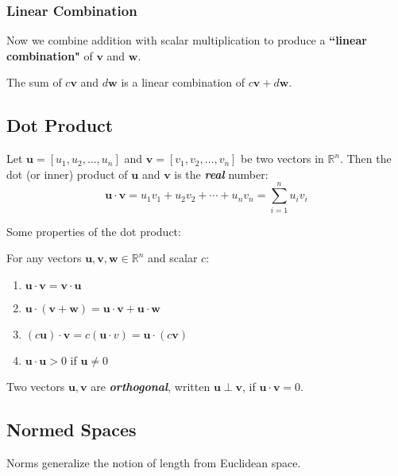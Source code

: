 \documentclass{article}
\begin{document}
\subsubsection{Linear Combination}
Now we combine addition with scalar multiplication to produce a \textbf{``linear combination"} of $\bm{v}$ and $\bm{w}$. 

\begin{theorem}
    The sum of $c\bm{v}$ and $d\bm{w}$ is a linear combination of $c\bm{v} + d\bm{w}$. 
\end{theorem}

\subsection{Dot Product}\label{sec:dotproduct}
\begin{definition}
    Let $\bm{u} = [u_{1}, u_{2}, \dots, u_n]$ and $\bm{v} = [v_{1}, v_{2}, \dots , v_n]$ be two vectors in $\mathbb{R}^n$. Then the dot (or inner) product of $\bm{u}$ and $\bm{v}$ is the \textbf{\textit{real}} number:
    \begin{equation*}
        \bm{u} \cdot \bm{v} = u_{1}v_{1} + u_{2}v_{2} + \cdots + u_n v_n = \sum_{i=1}^{n} u_i v_i 
    \end{equation*}
\end{definition}

\noindent Some properties of the dot product:

\begin{theorem}
    For any vectors $\bm{u}, \bm{v}, \bm{w} \in \mathbb{R}^n$ and scalar $c$:
    \begin{enumerate}
        \item $\bm{u} \cdot \bm{v} = \bm{v} \cdot \bm{u}$
        \item $\bm{u} \cdot (\bm{v} + \bm{w}) = \bm{u} \cdot \bm{v} + \bm{u} \cdot \bm{w}$
        \item $(c\bm{u}) \cdot \bm{v} = c(\bm{u} \cdot v) = \bm{u} \cdot (c\bm{v})$
        \item $\bm{u} \cdot \bm{u} > 0$ if $\bm{u} \neq 0$ 
    \end{enumerate}
\end{theorem}

\begin{theorem}\label{thm:orthogonality}
    Two vectors $\bm{u}, \bm{v}$ are \textbf{\textit{orthogonal}}, written $\bm{u} \perp \bm{v}$, if $\bm{u} \cdot \bm{v} = 0$.
\end{theorem}

\subsection{Normed Spaces}\label{sec:normedspaces}
Norms generalize the notion of length from Euclidean space. 
\end{document}
